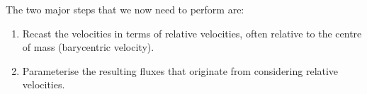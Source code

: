\noindent The two major steps that we now need to perform are:
\begin{enumerate}
\item Recast the velocities in terms of relative velocities, often relative to the centre of mass (barycentric velocity).
\item Parameterise the resulting fluxes that originate from considering relative velocities.
\end{enumerate}


